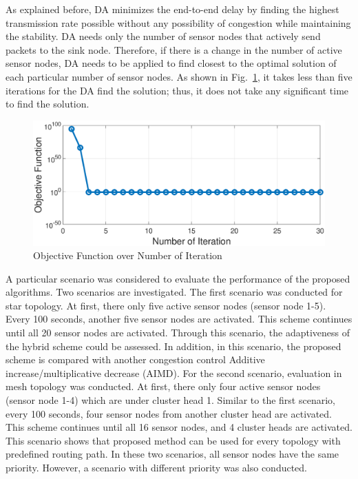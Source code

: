 As explained before, DA minimizes the end-to-end delay by finding the highest transmission rate possible without any possibility of congestion while maintaining the stability. DA needs only the number of sensor nodes that actively send packets to the sink node. Therefore, if there is a change in the number of active sensor nodes, DA needs to be applied to find closest to the optimal solution of each particular number of sensor nodes. As shown in Fig.~\ref{fig:of}, it takes less than five iterations for the DA find the solution; thus, it does not take any significant time to find the solution.

\begin{figure}
	\centering
	\includegraphics[width=1\linewidth]{pics/of}
	\caption{Objective Function over Number of Iteration}
	\label{fig:of}
\end{figure}

A particular scenario was considered to evaluate the performance of the proposed algorithms. Two scenarios are investigated. The first scenario was conducted for star topology. At first, there only five active sensor nodes (sensor node 1-5). Every 100 seconds, another five sensor nodes are activated. This scheme continues until all 20 sensor nodes are activated. Through this scenario, the adaptiveness of the hybrid scheme could be assessed. In addition, in this scenario, the proposed scheme is compared with another congestion control Additive increase/multiplicative decrease (AIMD). For the second scenario, evaluation in mesh topology was conducted. At first, there only four active sensor nodes (sensor node 1-4) which are under cluster head 1. Similar to the first scenario, every 100 seconds, four sensor nodes from another cluster head are activated. This scheme continues until all 16 sensor nodes, and 4 cluster heads are activated. This scenario shows that proposed method can be used for every topology with predefined routing path. In these two scenarios, all sensor nodes have the same priority. However, a scenario with different priority was also conducted.


